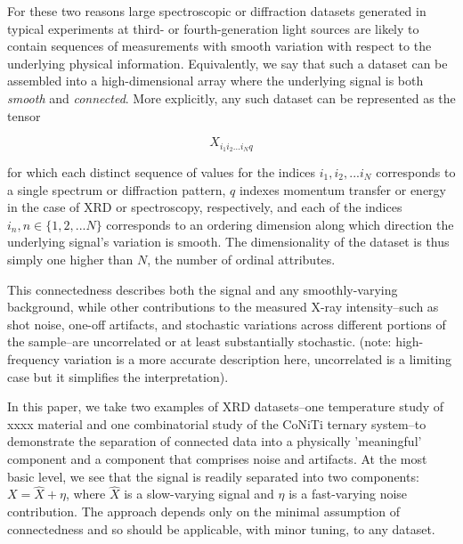 \documentclass[12pt]{iopart}
\begin{document}

For these two reasons large spectroscopic or diffraction datasets generated in typical experiments at third- or fourth-generation light sources are likely to contain sequences of measurements with smooth variation with respect to the underlying physical information. Equivalently, we say that such a dataset can be assembled into a high-dimensional array where the underlying signal is both \emph{smooth} and \emph{connected}. More explicitly, any such dataset can be represented as the tensor

\begin{equation}
X_{i_1i_2...i_Nq}
\end{equation}

for which each distinct sequence of values for the indices $i_1, i_2,... i_N$ corresponds to a single spectrum or diffraction pattern, $q$ indexes momentum transfer or energy in the case of XRD or spectroscopy, respectively, and each of the indices $i_n, n \in \{1, 2, ... N\}$ corresponds to an ordering dimension along which direction the underlying signal's variation is smooth. The dimensionality of the dataset is thus simply one higher than $N$, the number of ordinal attributes.


This connectedness describes both the signal and any smoothly-varying background, while other contributions to the measured X-ray intensity--such as shot noise, one-off artifacts, and stochastic variations across different portions of the sample--are uncorrelated or at least substantially stochastic. (note: high-frequency variation is a more accurate description here, uncorrelated is a limiting case but it simplifies the interpretation). 

In this paper, we take two examples of XRD datasets--one temperature study of xxxx material and one combinatorial study of the CoNiTi ternary system--to demonstrate the separation of connected data into a physically 'meaningful' component and a component that comprises noise and artifacts. At the most basic level, we see that the signal is readily separated into two components: $X = \hat{X} + \eta$, where $\hat{X}$ is a slow-varying signal and $\eta$ is a fast-varying noise contribution. The approach depends only on the minimal assumption of connectedness and so should be applicable, with minor tuning, to any dataset. 
\end{document}
